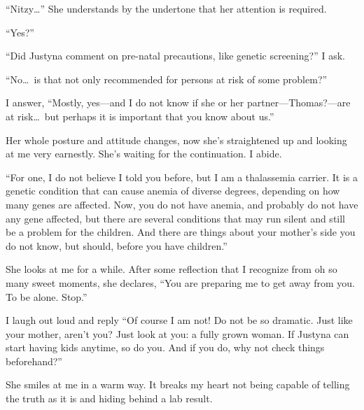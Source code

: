 \enquote{Nitzy\dots{}} She understands by the undertone that her attention is required.

\enquote{Yes?}

\enquote{Did Justyna comment on pre-natal precautions, like genetic screening?} I ask.

\enquote{No\dots~is that not only recommended for persons at risk of some problem?}

I answer, \enquote{Mostly, yes---and I do not know if she or her partner---Thomas?---are at risk\dots~but perhaps it is important that you know about us.}

Her whole posture and attitude changes, now she's straightened up and looking at me very earnestly. She's waiting for the continuation. I abide.

\enquote{For one, I do not believe I told you before, but I am a thalassemia carrier. It is a genetic condition that can cause anemia of diverse degrees, depending on how many genes are affected. Now, you do not have anemia, and probably do not have any gene affected, but there are several conditions that may run silent and still be a problem for the children. And there are things about your mother's side you do not know, but should, before you have children.}

She looks at me for a while. After some reflection that I recognize from oh so many sweet moments, she declares, \enquote{You are preparing me to get away from you. To be alone. Stop.}

I laugh out loud and reply \enquote{Of course I am not! Do not be so dramatic. Just like your mother, aren't you? Just look at you: a fully grown woman. If Justyna can start having kids anytime, so do you. And if you do, why not check things beforehand?}

She smiles at me in a warm way. It breaks my heart not being capable of telling the truth as it is and hiding behind a lab result.